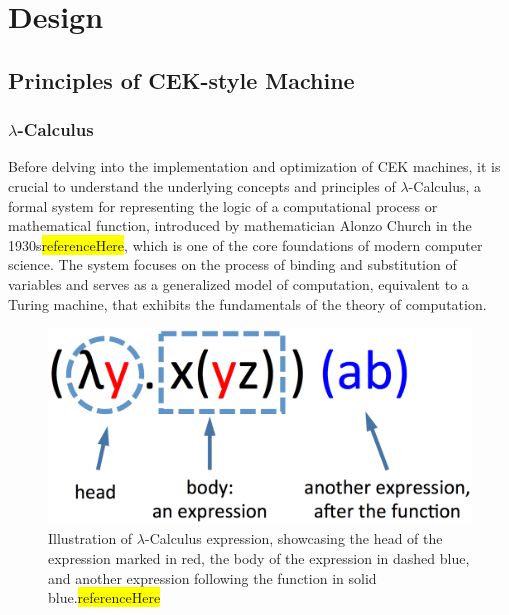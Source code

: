 \documentclass{l4proj}
\begin{document}
\chapter{Design}

\section{Principles of CEK-style Machine}

\subsection{$\lambda$-Calculus}
Before delving into the implementation and optimization of CEK machines, it is crucial to understand the underlying concepts and principles of $\lambda$-Calculus, a formal system for representing the logic of a computational process or mathematical function, introduced by mathematician Alonzo Church in the 1930s\colorbox{yellow}{referenceHere}, which is one of the core foundations of modern computer science. The system focuses on the process of binding and substitution of variables and serves as a generalized model of computation, equivalent to a Turing machine, that exhibits the fundamentals of the theory of computation.

\begin{figure}[h]
    \centering
    \includegraphics[width=0.35\linewidth]{dissertation/images/lambda1.png}    
    \caption{Illustration of $\lambda$-Calculus expression, showcasing the head of the expression marked in red, the body of the expression in dashed blue, and another expression following the function in solid blue.\colorbox{yellow}{referenceHere}}
    \label{fig:lambda} 
\end{figure}
\end{document}
